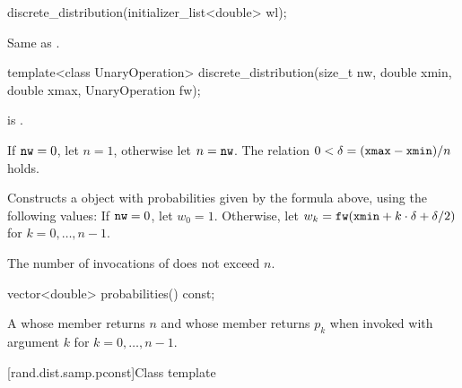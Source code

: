 %
\begin{itemdecl}
discrete_distribution(initializer_list<double> wl);
\end{itemdecl}

\begin{itemdescr}
\pnum
\effects
 Same as .
\end{itemdescr}

\begin{itemdecl}
template<class UnaryOperation>
  discrete_distribution(size_t nw, double xmin, double xmax, UnaryOperation fw);
\end{itemdecl}

\begin{itemdescr}
\pnum
\mandates
{} is .

\pnum
\expects
 If $\texttt{nw} = 0$, let $n = 1$, otherwise let $n = \texttt{nw}$.
 The relation
   $0 < \delta = (\texttt{xmax} - \texttt{xmin}) / n$
 holds.

\pnum
\effects
Constructs a  object
 with probabilities given by the formula above,
 using the following values:
 If $\texttt{nw} = 0$,
 let $w_0 = 1$.
 Otherwise,
 let $w_k = \texttt{fw}(\texttt{xmin} + k \cdot \delta + \delta / 2)$
 for $k = 0, \dotsc, n - 1$.

\pnum
\complexity
The number of invocations of  does not exceed $n$.
\end{itemdescr}

%
\begin{itemdecl}
vector<double> probabilities() const;
\end{itemdecl}

\begin{itemdescr}
\pnum
\returns
A 
 whose  member returns $n$
 and whose  member returns $p_k$
 when invoked with argument $k$ for $k = 0, \dotsc, n - 1$.
\end{itemdescr}



[rand.dist.samp.pconst]{Class template }%
%
%

